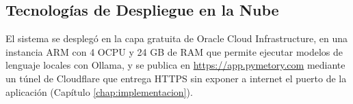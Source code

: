 \subsection{Tecnologías de Despliegue en la Nube}
\label{sec:cloud}

El sistema se desplegó en la capa gratuita de Oracle Cloud Infrastructure, en una instancia ARM con 4 OCPU y 24 GB de RAM que permite ejecutar modelos de lenguaje locales con Ollama, y se publica en \url{https://app.pymetory.com} mediante un túnel de Cloudflare que entrega HTTPS sin exponer a internet el puerto de la aplicación (Capítulo \ref{chap:implementacion}).
